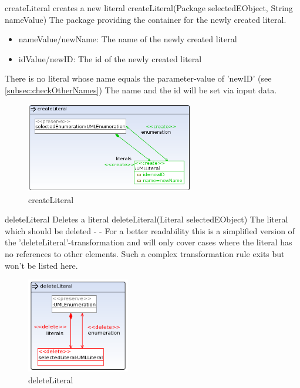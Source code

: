 \op
{createLiteral}
{creates a new literal}
{createLiteral(Package selectedEObject, String nameValue)}
{The package providing the container for the newly created literal.}
{
\begin{itemize}
 \item nameValue/newName: The name of the newly created literal
 \item idValue/newID: The id of the newly created literal
\end{itemize}
}
{There is no literal whose name equals the parameter-value of 'newID' (see
\ref{subsec:checkOtherNames})}
{The name and the id will be set via input data.}
\begin{figure}[H]
  \centering
  \includegraphics[width=0.65\textwidth]{pics/createLiteral.png}
  \caption{createLiteral}
  \label{createLiteral}
\end{figure}
\op
{deleteLiteral}
{Deletes a literal}
{deleteLiteral(Literal selectedEObject)}
{The literal which should be deleted}
{-}
{-}
{For a better readability this is a simplified version of the
'deleteLiteral'-transformation and will only cover cases where the
literal has no references to other elements. Such a
complex transformation rule exits but won't be listed here.}
\begin{figure}[H]
  \centering
  \includegraphics[width=0.4\textwidth]{pics/deleteLiteral_emptyAndUnreferenced.png}
  \caption{deleteLiteral}
  \label{deleteLiteral}
\end{figure}
